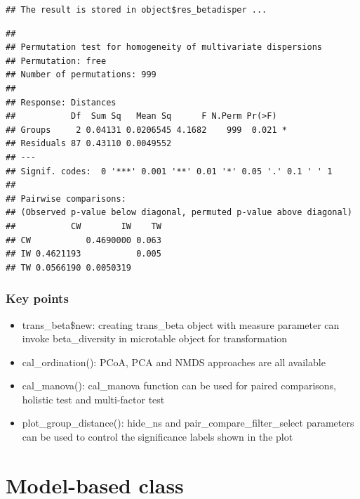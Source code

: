 \documentclass[
]{book}
\newenvironment{Shaded}{\begin{snugshade}}{\end{snugshade}}
\newcommand{\NormalTok}[1]{#1}
\newcommand{\SpecialCharTok}[1]{\textcolor[rgb]{0.00,0.00,0.00}{#1}}
\providecommand{\tightlist}{%
  \setlength{\itemsep}{0pt}\setlength{\parskip}{0pt}}
\begin{document}
\begin{verbatim}
## The result is stored in object$res_betadisper ...
\end{verbatim}

\begin{Shaded}
\end{Shaded}

\begin{verbatim}
## 
## Permutation test for homogeneity of multivariate dispersions
## Permutation: free
## Number of permutations: 999
## 
## Response: Distances
##           Df  Sum Sq   Mean Sq      F N.Perm Pr(>F)  
## Groups     2 0.04131 0.0206545 4.1682    999  0.021 *
## Residuals 87 0.43110 0.0049552                       
## ---
## Signif. codes:  0 '***' 0.001 '**' 0.01 '*' 0.05 '.' 0.1 ' ' 1
## 
## Pairwise comparisons:
## (Observed p-value below diagonal, permuted p-value above diagonal)
##           CW        IW    TW
## CW           0.4690000 0.063
## IW 0.4621193           0.005
## TW 0.0566190 0.0050319
\end{verbatim}

\hypertarget{key-points-4}{%
\subsection{Key points}\label{key-points-4}}

\begin{itemize}
\tightlist
\item
  trans\_beta\$new: creating trans\_beta object with measure parameter can invoke beta\_diversity in microtable object for transformation
\item
  cal\_ordination(): PCoA, PCA and NMDS approaches are all available
\item
  cal\_manova(): cal\_manova function can be used for paired comparisons, holistic test and multi-factor test
\item
  plot\_group\_distance(): hide\_ns and pair\_compare\_filter\_select parameters can be used to control the significance labels shown in the plot
\end{itemize}

\hypertarget{model-based-class}{%
\chapter{Model-based class}\label{model-based-class}}
\end{document}
